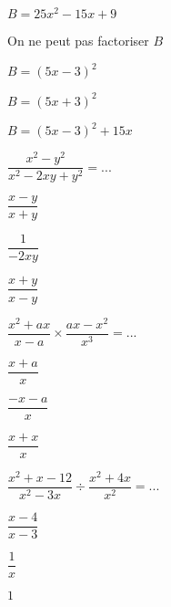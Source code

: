 \begin{QCM}
\begin{GroupeQCM}
    
     \begin{exercice}
      $B=25x^2-15x+9$
      \begin{ChoixQCM}{4}
      \item On ne peut pas factoriser $B$
      \item $B=(5x-3)^2$
      \item $B=(5x+3)^2$
      \item $B=(5x-3)^2+15x$
      \end{ChoixQCM}
      \begin{corrige}
   \end{corrige}
    \end{exercice}
    
      \begin{exercice}
      $\dfrac{x^2-y^2}{x^2-2xy+y^2}=...$
      \begin{ChoixQCM}{3}
      \item $\dfrac{x-y}{x+y}$
      \item $\dfrac{1}{-2xy}$
      \item $\dfrac{x+y}{x-y}$
      \end{ChoixQCM}
      \begin{corrige}
   \end{corrige}
    \end{exercice}
    
      \begin{exercice}
      $\dfrac{x^2+ax}{x-a}\times \dfrac{ax-x^2}{x^3}=...$
      \begin{ChoixQCM}{3}
      \item $\dfrac{x+a}{x}$
      \item $\dfrac{-x-a}{x}$
      \item $\dfrac{x+x}{x}$
      \end{ChoixQCM}
      \begin{corrige}
   \end{corrige}
    \end{exercice}
    
      \begin{exercice}
      $\dfrac{x^2+x-12}{x^2-3x}\div \dfrac{x^2+4x}{x^2}=...$
      \begin{ChoixQCM}{3}
      \item $\dfrac{x-4}{x-3}$
      \item $\dfrac{1}{x}$
      \item $1$
      \end{ChoixQCM}
      \begin{corrige}
   \end{corrige}
    \end{exercice}
 \end{GroupeQCM}  
\end{QCM}  
    

    
   

  
